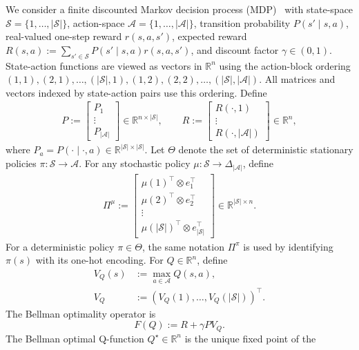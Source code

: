 \documentclass[letterpaper]{article}
\numberwithin{equation}{section}
\newcommand{\R}{\mathbb{R}}
\begin{document}
We consider a finite discounted Markov decision process (MDP)~\citep{puterman1994markov,bertsekas1996neuro} with state-space
$\mathcal S=\{1,\ldots,|\mathcal S|\}$, action-space
$\mathcal A=\{1,\ldots,|\mathcal A|\}$, transition probability
$P(s'\mid s,a)$, real-valued one-step reward $r(s,a,s')$, expected reward $R(s,a):=\sum_{s'\in\mathcal S}P(s'\mid s,a)r(s,a,s')$, and discount factor $\gamma\in(0,1)$. State-action functions are viewed as
vectors in $\R^{n}$ using the action-block ordering $(1,1),(2,1),\ldots,(|\mathcal S|,1),
(1,2),(2,2),\ldots,(|\mathcal S|,|\mathcal A|)$. All matrices and vectors indexed by state-action pairs use this ordering. Define
\begin{align*}
P:=
\begin{bmatrix}
P_1\\
\vdots\\
P_{|\mathcal A|}
\end{bmatrix}
\in\R^{n\times |\mathcal S|},
\qquad
R:=
\begin{bmatrix}
R(\cdot,1)\\
\vdots\\
R(\cdot,|\mathcal A|)
\end{bmatrix}
\in\R^{n},
\end{align*}
where $P_a=P(\cdot\mid\cdot,a)\in\R^{|\mathcal S|\times|\mathcal S|}$.
Let $\Theta$ denote the set of deterministic stationary policies
$\pi:\mathcal S\to\mathcal A$. For any stochastic policy
$\mu:\mathcal S\to\Delta_{|\mathcal A|}$, define
\begin{align*}
\Pi^\mu:=
\begin{bmatrix}
\mu(1)^\top\otimes e_1^\top\\
\mu(2)^\top\otimes e_2^\top\\
\vdots\\
\mu(|\mathcal S|)^\top\otimes e_{|\mathcal S|}^\top
\end{bmatrix}
\in\R^{|\mathcal S|\times n}.
\end{align*}
For a deterministic policy $\pi\in\Theta$, the same notation $\Pi^\pi$ is used by
identifying $\pi(s)$ with its one-hot encoding.
For
$Q\in\R^{n}$, define
\begin{align*}
V_Q(s)&:=\max_{a\in\mathcal A}Q(s,a),\\
V_Q&:=(V_Q(1),\ldots,V_Q(|\mathcal S|))^\top.
\end{align*}
The Bellman optimality operator is
\begin{equation*}
  F(Q):=R+\gamma P V_Q.
\end{equation*}
The Bellman optimal Q-function $Q^\star\in\R^n$ is the unique fixed point of the
\end{document}
